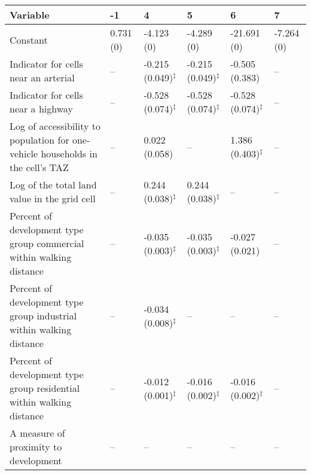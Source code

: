 
\begin{tabular}{p{3in}p{0.5in}p{0.5in}p{0.5in}p{0.5in}p{0.5in}}
\hline\hline
Variable & -1 & 4 & 5 & 6 & 7 \\\hline
Constant & 0.731 (0) & -4.123 (0) & -4.289 (0) & -21.691 (0) & -7.264 (0) \\
Indicator for cells near an arterial & -- & -0.215 (0.049)$^{\ddagger}$ & -0.215 (0.049)$^{\ddagger}$ & -0.505 (0.383) & -- \\
Indicator for cells near a highway & -- & -0.528 (0.074)$^{\ddagger}$ & -0.528 (0.074)$^{\ddagger}$ & -0.528 (0.074)$^{\ddagger}$ & -- \\
Log of accessibility to population for one-vehicle households in the cell's TAZ & -- & 0.022 (0.058) & -- & 1.386 (0.403)$^{\ddagger}$ & -- \\
Log of the total land value in the grid cell & -- & 0.244 (0.038)$^{\ddagger}$ & 0.244 (0.038)$^{\ddagger}$ & -- & -- \\
Percent of development type group commercial within walking distance & -- & -0.035 (0.003)$^{\ddagger}$ & -0.035 (0.003)$^{\ddagger}$ & -0.027 (0.021) & -- \\
Percent of development type group industrial within walking distance & -- & -0.034 (0.008)$^{\ddagger}$ & -- & -- & -- \\
Percent of development type group residential within walking distance & -- & -0.012 (0.001)$^{\ddagger}$ & -0.016 (0.002)$^{\ddagger}$ & -0.016 (0.002)$^{\ddagger}$ & -- \\
A measure of proximity to development & -- & -- & -- & -- & -- \\
\hline\hline
\end{tabular}
